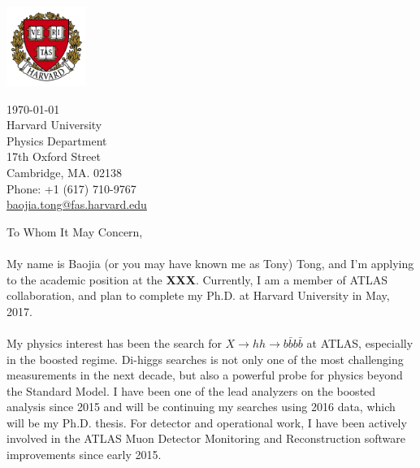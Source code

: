 \documentclass[letterpaper,11pt,oneside]{article}
\begin{document}
\begin{minipage}{.5\textwidth}
  \includegraphics[height=7em]{Harvard}
\end{minipage}
\begin{minipage}{.5\textwidth}
\begin{flushright}
 \today                           \\
 \vspace{1em}                              
 Harvard University            \\
 Physics Department                  \\
 17th Oxford Street                       \\
 Cambridge, MA. 02138   \\
 Phone: +1 (617) 710-9767         \\
\href{mailto:baojia.tong@fas.harvard.edu}{baojia.tong@fas.harvard.edu}  \\ 
\end{flushright}
\end{minipage}

\vspace{2em}
To Whom It May Concern, \\

\onehalfspacing
\paragraph{}
My name is Baojia (or you may have known me as Tony) Tong, and I'm applying to the academic position at the \textbf{XXX}. Currently, I am a member of ATLAS collaboration, and plan to complete my Ph.D. at Harvard University in May, 2017.

\paragraph{}
My physics interest has been the search for $X \to hh \to b\bar{b}b\bar{b}$ at ATLAS, especially in the boosted regime. Di-higgs searches is not only one of the most challenging measurements in the next decade, but also a powerful probe for physics beyond the Standard Model. I have been one of the lead analyzers on the boosted analysis since 2015 and will be continuing my searches using 2016 data, which will be my Ph.D. thesis. For detector and operational work, I have been actively involved in the ATLAS Muon Detector Monitoring and Reconstruction software improvements since early 2015.
\end{document}
